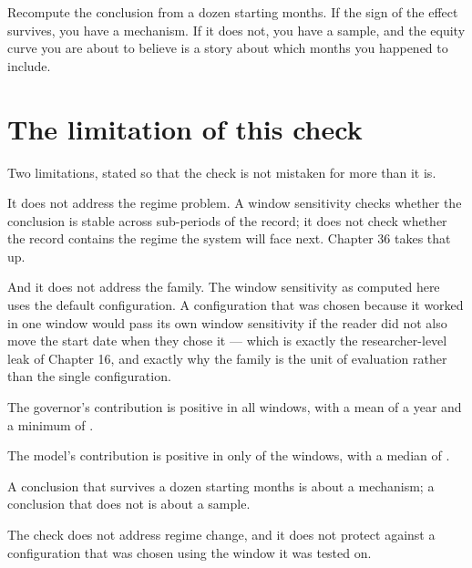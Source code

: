 \begin{takeaway}
Recompute the conclusion from a dozen starting months. If the sign of the
effect survives, you have a mechanism. If it does not, you have a sample,
and the equity curve you are about to believe is a story about which
months you happened to include.
\end{takeaway}

\section{The limitation of this check}

Two limitations, stated so that the check is not mistaken for more than it
is.

It does not address the regime problem. A window sensitivity checks
whether the conclusion is stable across sub-periods of the record; it
does not check whether the record contains the regime the system will
face next. Chapter 36 takes that up.

And it does not address the family. The window sensitivity as computed
here uses the default configuration. A configuration that was chosen
because it worked in one window would pass its own window sensitivity if
the reader did not also move the start date when they chose it --- which
is exactly the researcher-level leak of Chapter 16, and exactly why the
family is the unit of evaluation rather than the single configuration.

\begin{keytakeaways}
\item The governor's contribution is positive in all \numWindowCount{}
windows, with a mean of \numGovMean{} a year and a minimum of
\numGovMin{}.
\item The model's contribution is positive in only \numTiltPosFrac{} of
the windows, with a median of \numTiltMedian{}.
\item A conclusion that survives a dozen starting months is about a
mechanism; a conclusion that does not is about a sample.
\item The check does not address regime change, and it does not protect
against a configuration that was chosen using the window it was tested
on.
\end{keytakeaways}
